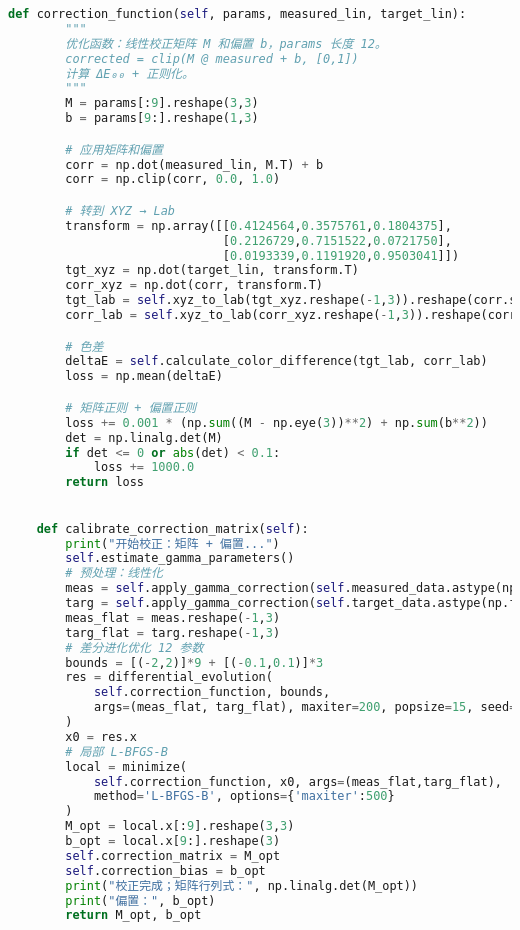 \begin{lstlisting}[language=Python]
    def correction_function(self, params, measured_lin, target_lin):
        """
        优化函数：线性校正矩阵 M 和偏置 b，params 长度 12。
        corrected = clip(M @ measured + b, [0,1])
        计算 ΔE₀₀ + 正则化。
        """
        M = params[:9].reshape(3,3)
        b = params[9:].reshape(1,3)

        # 应用矩阵和偏置
        corr = np.dot(measured_lin, M.T) + b
        corr = np.clip(corr, 0.0, 1.0)

        # 转到 XYZ → Lab
        transform = np.array([[0.4124564,0.3575761,0.1804375],
                              [0.2126729,0.7151522,0.0721750],
                              [0.0193339,0.1191920,0.9503041]])
        tgt_xyz = np.dot(target_lin, transform.T)
        corr_xyz = np.dot(corr, transform.T)
        tgt_lab = self.xyz_to_lab(tgt_xyz.reshape(-1,3)).reshape(corr.shape)
        corr_lab = self.xyz_to_lab(corr_xyz.reshape(-1,3)).reshape(corr.shape)

        # 色差
        deltaE = self.calculate_color_difference(tgt_lab, corr_lab)
        loss = np.mean(deltaE)

        # 矩阵正则 + 偏置正则
        loss += 0.001 * (np.sum((M - np.eye(3))**2) + np.sum(b**2))
        det = np.linalg.det(M)
        if det <= 0 or abs(det) < 0.1:
            loss += 1000.0
        return loss

    
    def calibrate_correction_matrix(self):
        print("开始校正：矩阵 + 偏置...")
        self.estimate_gamma_parameters()
        # 预处理：线性化
        meas = self.apply_gamma_correction(self.measured_data.astype(np.float32), inverse=True)/255.0
        targ = self.apply_gamma_correction(self.target_data.astype(np.float32), inverse=True)/255.0
        meas_flat = meas.reshape(-1,3)
        targ_flat = targ.reshape(-1,3)
        # 差分进化优化 12 参数
        bounds = [(-2,2)]*9 + [(-0.1,0.1)]*3
        res = differential_evolution(
            self.correction_function, bounds,
            args=(meas_flat, targ_flat), maxiter=200, popsize=15, seed=42
        )
        x0 = res.x
        # 局部 L-BFGS-B
        local = minimize(
            self.correction_function, x0, args=(meas_flat,targ_flat),
            method='L-BFGS-B', options={'maxiter':500}
        )
        M_opt = local.x[:9].reshape(3,3)
        b_opt = local.x[9:].reshape(3)
        self.correction_matrix = M_opt
        self.correction_bias = b_opt
        print("校正完成；矩阵行列式：", np.linalg.det(M_opt))
        print("偏置：", b_opt)
        return M_opt, b_opt


\end{lstlisting}

